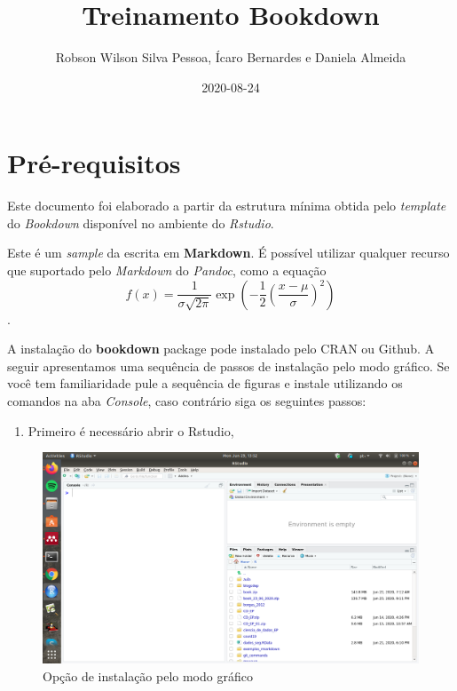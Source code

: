 \documentclass[
]{book}
\title{Treinamento Bookdown}
\author{Robson Wilson Silva Pessoa, Ícaro Bernardes e Daniela Almeida}
\date{2020-08-24}
\newenvironment{Shaded}{\begin{snugshade}}{\end{snugshade}}
\newcommand{\DataTypeTok}[1]{\textcolor[rgb]{0.13,0.29,0.53}{#1}}
\newcommand{\KeywordTok}[1]{\textcolor[rgb]{0.13,0.29,0.53}{\textbf{#1}}}
\newcommand{\NormalTok}[1]{#1}
\newcommand{\OperatorTok}[1]{\textcolor[rgb]{0.81,0.36,0.00}{\textbf{#1}}}
\newcommand{\OtherTok}[1]{\textcolor[rgb]{0.56,0.35,0.01}{#1}}
\providecommand{\tightlist}{%
  \setlength{\itemsep}{0pt}\setlength{\parskip}{0pt}}
\begin{document}
\maketitle

{
\setcounter{tocdepth}{1}
\tableofcontents
}
\begin{Shaded}
\end{Shaded}

\hypertarget{pruxe9-requisitos}{%
\chapter{Pré-requisitos}\label{pruxe9-requisitos}}

Este documento foi elaborado a partir da estrutura mínima
obtida pelo \emph{template} do \emph{Bookdown} disponível no ambiente
do \emph{Rstudio}.

Este é um \emph{sample} da escrita em \textbf{Markdown}. É
possível utilizar qualquer recurso que suportado
pelo \emph{Markdown} do \emph{Pandoc}, como a
equação
\[f(x) = \frac{1}{\sigma\sqrt{2\pi}}\exp\left(-\frac{1}{2}\left(\frac{x-\mu}{\sigma}\right)^2\right)\].

A instalação do \textbf{bookdown} package pode instalado pelo CRAN ou Github. A seguir apresentamos uma sequência
de passos de instalação pelo modo gráfico. Se
você tem familiaridade pule a sequência de
figuras e instale utilizando os comandos na aba
\emph{Console}, caso contrário siga os seguintes passos:

\begin{enumerate}
\def\labelenumi{\arabic{enumi}.}
\tightlist
\item
  Primeiro é necessário abrir o Rstudio,
\end{enumerate}

\begin{figure}
\centering
\includegraphics{fig/open_Rstudio.png}
\caption{Opção de instalação pelo modo gráfico}
\end{figure}
\end{document}

